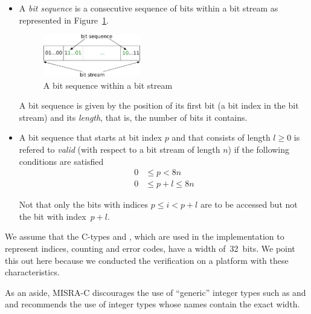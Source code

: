 \begin{itemize}
\item
A \emph{bit sequence} is a consecutive sequence of bits within a bit stream
as represented in Figure~\ref{fig:bitsequence}.
\begin{figure}[hbt]
\begin{center}
\includegraphics[width=0.40\textwidth]{figures/bit_sequence.pdf}
\caption{\label{fig:bitsequence} A bit sequence within a bit stream}
\end{center}
\end{figure}

A bit sequence is given by the position of its first bit (a bit index in the bit stream)
and its \emph{length}, that is, the number of bits it contains.

\item

A bit sequence that starts at bit index $p$ and that consists of
length $l \geq 0$ is refered to \emph{valid} (with respect to a bit stream of length $n$)
if the following conditions are satisfied
\begin{align*}
  0 &\leq p < 8n \\
  0 &\leq p + l \leq 8n
\end{align*}

Not that only the bits with indices $p \leq i < p + l$ are to be accessed
but not the bit with index~$p+l$.

\end{itemize}

We assume that the C-types  and , which
are used in the implementation to represent indices, counting and error codes,
have a width of~32~bits.
We point this out here because we conducted the verification on a platform with
these characteristics.

As an aside, MISRA-C discourages the use of ``generic'' integer types
such as  and  and recommends the use of integer types whose names
contain the exact width.

